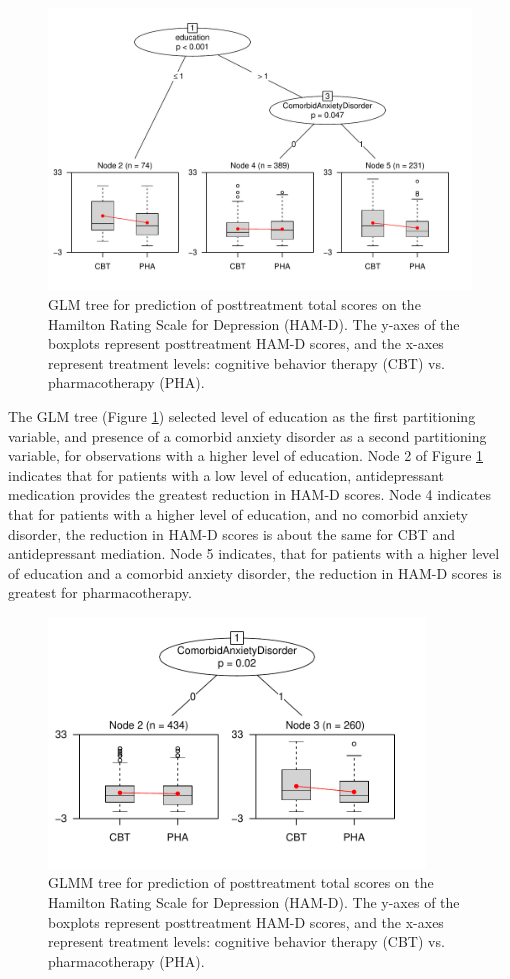 \documentclass[nobf,doc]{apa}
\begin{document}
\begin{figure}[!ht]
    \includegraphics[width=12cm]{app_lmtree.pdf}
	\caption{GLM tree for prediction of posttreatment total scores on the Hamilton Rating Scale for Depression (HAM-D). The y-axes of the boxplots represent posttreatment HAM-D scores, and the x-axes represent treatment levels: cognitive behavior therapy (CBT) vs. pharmacotherapy (PHA).}
	\label{fig:lmtree_C&W}
\end{figure}

The GLM tree (Figure \ref{fig:lmtree_C&W}) selected level of education as the first partitioning variable, and presence of a comorbid anxiety disorder as a second partitioning variable, for observations with a higher level of education. Node 2 of Figure \ref{fig:lmtree_C&W} indicates that for patients with a low level of education, antidepressant medication provides the greatest reduction in HAM-D scores. Node 4 indicates that for patients with a higher level of education, and no comorbid anxiety disorder, the reduction in HAM-D scores is about the same for CBT and antidepressant mediation. Node 5 indicates, that for patients with a higher level of education and a comorbid anxiety disorder, the reduction in HAM-D scores is greatest for pharmacotherapy.


\begin{figure}[!ht]
    \includegraphics[width=10cm]{app_lmertree.pdf}
	\caption{GLMM tree for prediction of posttreatment total scores on the Hamilton Rating Scale for Depression (HAM-D). The y-axes of the boxplots represent posttreatment HAM-D scores, and the x-axes represent treatment levels: cognitive behavior therapy (CBT) vs. pharmacotherapy (PHA).}
	\label{fig:lmertree_C&W}
\end{figure}
\end{document}
